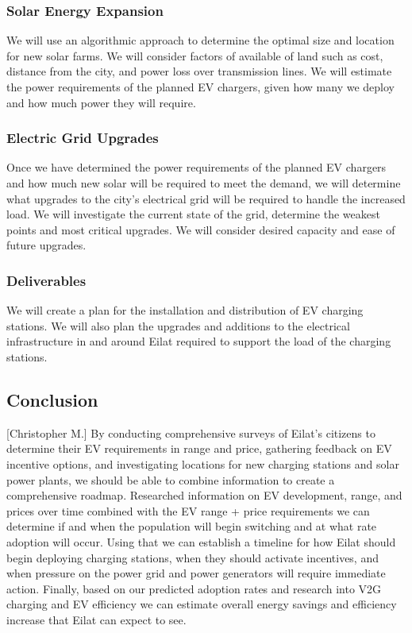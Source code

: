 \documentclass[12pt]{article}                         %
\begin{document}
\subsubsection{Solar Energy Expansion}
 We will use an algorithmic approach to determine the optimal size and location for new solar farms. We will consider factors of available of land such as cost, distance from the city, and power loss over transmission lines. We will estimate the power requirements of the planned EV chargers, given how many we deploy and how much power they will require.

\subsubsection{Electric Grid Upgrades}
Once we have determined the power requirements of the planned EV chargers and how much new solar will be required to meet the demand, we will determine what upgrades to the city's electrical grid will be required to handle the increased load. We will investigate the current state of the grid, determine the weakest points and most critical upgrades. We will consider desired capacity and ease of future upgrades. 

\subsubsection{Deliverables}
We will create a plan for the installation and distribution of EV charging stations. We will also plan the upgrades and additions to the electrical infrastructure in and around Eilat required to support the load of the charging stations.

\subsection{Conclusion}[Christopher M.]
By conducting comprehensive surveys of Eilat's citizens to determine their EV requirements in range and price, gathering feedback on EV incentive options, and investigating locations for new charging stations and solar power plants, we should be able to combine information to create a comprehensive roadmap. Researched information on EV development, range, and prices over time combined with the EV range + price requirements we can determine if and when the population will begin switching and at what rate adoption will occur. Using that we can establish a timeline for how Eilat should begin deploying charging stations, when they should activate incentives, and when pressure on the power grid and power generators will require immediate action. Finally, based on our predicted adoption rates and research into V2G charging and EV efficiency we can estimate overall energy savings and efficiency increase that Eilat can expect to see.

\newpage


\end{document}
